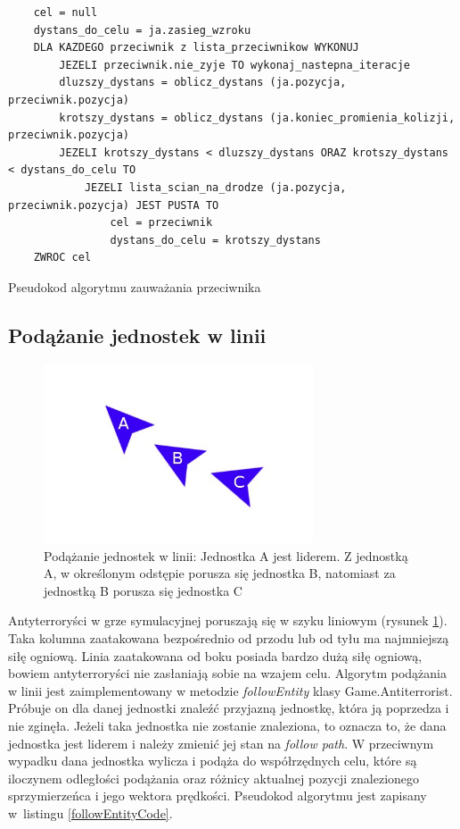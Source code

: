 \begin{table}
\begin{center}
\begin{lstlisting}
	cel = null
	dystans_do_celu = ja.zasieg_wzroku
	DLA KAZDEGO przeciwnik z lista_przeciwnikow WYKONUJ
		JEZELI przeciwnik.nie_zyje TO wykonaj_nastepna_iteracje
		dluzszy_dystans = oblicz_dystans (ja.pozycja, przeciwnik.pozycja)
		krotszy_dystans = oblicz_dystans (ja.koniec_promienia_kolizji, przeciwnik.pozycja)
		JEZELI krotszy_dystans < dluzszy_dystans ORAZ krotszy_dystans < dystans_do_celu TO
			JEZELI lista_scian_na_drodze (ja.pozycja, przeciwnik.pozycja) JEST PUSTA TO
				cel = przeciwnik
				dystans_do_celu = krotszy_dystans		
	ZWROC cel	
\end{lstlisting}
\caption {Pseudokod algorytmu zauważania przeciwnika}
\label{detectionCode}
\end{center}
\end{table}

\subsection{Podążanie jednostek w linii}

\begin{figure}
\begin{center}
	\includegraphics[width=80mm,height=53mm]{images/followEntity}
	\caption[Podążanie jednostek w linii]{Podążanie jednostek w linii: Jednostka A jest liderem. Z jednostką A, w określonym odstępie porusza się jednostka B, natomiast za jednostką B porusza się jednostka C\label{followEntityImage}}
\end{center}
\end{figure}

Antyterroryści w grze symulacyjnej poruszają się w szyku liniowym (rysunek \ref{followEntityImage}). Taka kolumna zaatakowana bezpośrednio od przodu lub od tyłu ma najmniejszą siłę ogniową. Linia zaatakowana od boku posiada bardzo dużą siłę ogniową, bowiem antyterroryści nie zasłaniają sobie na wzajem celu. Algorytm podążania w linii jest zaimplementowany w metodzie \emph{followEntity} klasy Game.Antiterrorist. Próbuje on dla danej jednostki znaleźć przyjazną jednostkę, która ją poprzedza i nie zginęła. Jeżeli taka jednostka nie zostanie znaleziona, to oznacza to, że dana jednostka jest liderem i należy zmienić jej stan na \emph{follow path}. W przeciwnym wypadku dana jednostka wylicza i podąża do współrzędnych celu, które są iloczynem odległości podążania oraz różnicy aktualnej pozycji znalezionego sprzymierzeńca i jego wektora prędkości. Pseudokod algorytmu jest zapisany w~listingu \ref{followEntityCode}.

